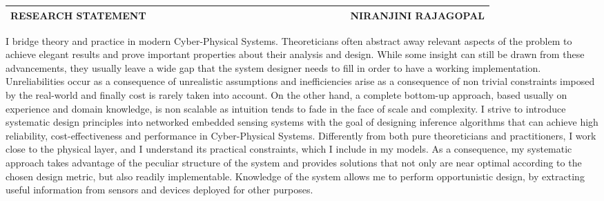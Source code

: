 \documentclass[10pt]{article}
\date{}
\begin{document}


\begin{table}
\color{blue}
\begin{tabular*}{\textwidth}{l r}
\large\textbf{RESEARCH STATEMENT} & 
\hfill \ \ \ \ \ \ \ \ \ \ \ \ \ \ \ \ \ \ \ \
\ \ \ \ \ \ \ \ \ \ \ \ \ \ \
\large\textbf{NIRANJINI RAJAGOPAL}\\
\hline
\end{tabular*}

\end{table}
 

I bridge theory and practice in modern Cyber-Physical Systems. %
Theoreticians often abstract away relevant aspects of the problem to achieve elegant results and prove important properties about their analysis and design. While some insight can still be drawn from these advancements, they usually leave a wide gap that the system designer needs to fill in order to have a working implementation. Unreliabilities occur as a consequence of unrealistic assumptions and inefficiencies arise as a consequence of non trivial constraints imposed by the real-world and finally cost is rarely taken into account. On the other hand, a complete bottom-up approach, based usually on experience and domain knowledge, is non scalable as intuition tends to fade in the face of scale and complexity. I strive to introduce systematic design principles into networked embedded sensing systems with the goal of designing inference algorithms that can achieve high reliability, cost-effectiveness and performance in Cyber-Physical Systems. Differently from both pure theoreticians and practitioners, I work close to the physical layer, and I understand its practical constraints, which I include in my models. As a consequence, my systematic approach takes advantage of the peculiar structure of the system and provides solutions that not only are near optimal according to the chosen design metric, but also readily implementable. Knowledge of the system allows me to perform opportunistic design, by extracting useful information from sensors and devices deployed for other purposes. \\
\end{document}
